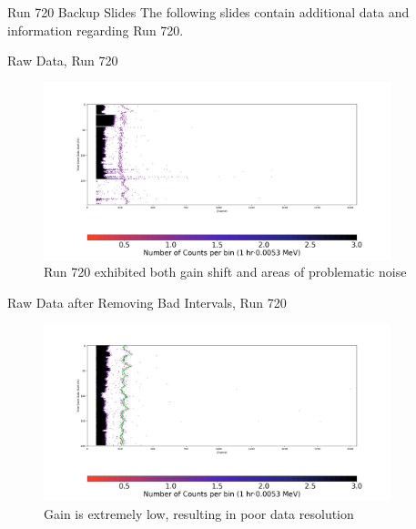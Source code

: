 \documentclass[aspectratio=169]{beamer}
\begin{document}
\begin{frame}{Run 720 Backup Slides}
\label{720_Backup}
    The following slides contain additional data and information regarding Run 720.
\end{frame}

\begin{frame}{Raw Data, Run 720}
    \begin{figure}
        \begin{center}
            \includegraphics[width=0.9\textwidth]
            {assets/720/RD.png}
            \caption{Run 720 exhibited both gain shift and areas of problematic noise}
        \end{center}
    \end{figure}
\end{frame}

\begin{frame}{Raw Data after Removing Bad Intervals, Run 720}
    \begin{figure}
        \begin{center}
            \includegraphics[width=0.9\textwidth]
            {assets/720/RDP.png}
            \caption{Gain is extremely low, resulting in poor data resolution}
        \end{center}
    \end{figure}
\end{frame}
\end{document}
